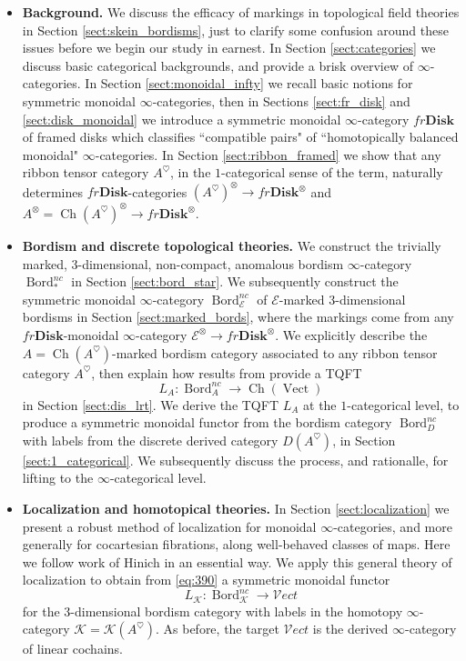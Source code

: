 \documentclass[reqno]{amsart}
\theoremstyle{definition}
\newcommand{\msc}[1]{\mathscr{#1}}
\newcommand{\opn}[1]{\operatorname{#1}}
\newcommand{\ot}{\otimes}
\newcommand{\Vect}{\msc{V}\!ect}
\newcommand{\Disk}{\mathbf{Disk}}
\DeclareMathOperator{\Bord}{Bord}
\renewcommand{\1}{\mathbf{1}}
\begin{document}
\begin{itemize}
\item {\bf Background.} We discuss the efficacy of markings in topological field theories in Section \ref{sect:skein_bordisms}, just to clarify some confusion around these issues before we begin our study in earnest. In Section \ref{sect:categories} we discuss basic categorical backgrounds, and provide a brisk overview of $\infty$-categories.  In Section \ref{sect:monoidal_infty} we recall basic notions for symmetric monoidal $\infty$-categories, then in Sections \ref{sect:fr_disk} and \ref{sect:disk_monoidal} we introduce a symmetric monoidal $\infty$-category $fr\Disk$ of framed disks which classifies ``compatible pairs" of ``homotopically balanced monoidal" $\infty$-categories. In Section \ref{sect:ribbon_framed} we show that any ribbon tensor category $A^{\heartsuit}$, in the $1$-categorical sense of the term, naturally determines $fr\Disk$-categories $(A^{\heartsuit})^{\ot}\to fr\Disk^{\ot}$ and $A^{\ot}=\opn{Ch}(A^{\heartsuit})^{\ot}\to fr\Disk^{\ot}$.
\vspace{2mm}

\item {\bf Bordism and discrete topological theories.} We construct the trivially marked, $3$-dimensional, non-compact, anomalous bordism $\infty$-category $\Bord_{\ast}^{nc}$ in Section \ref{sect:bord_star}. We subsequently construct the symmetric monoidal $\infty$-category $\Bord^{nc}_{\msc{E}}$ of $\msc{E}$-marked $3$-dimensional bordisms in Section \ref{sect:marked_bords}, where the markings come from any $fr\Disk$-monoidal $\infty$-category $\msc{E}^{\ot}\to fr\Disk^{\ot}$.  We explicitly describe the $A=\opn{Ch}(A^{\heartsuit})$-marked bordism category associated to any ribbon tensor category $A^{\heartsuit}$, then explain how results from \cite{derenzietal23,czenkynegron} provide a TQFT
\begin{equation}\label{eq:390}
L_{A}:\Bord_{A}^{nc}\to \opn{Ch}(\opn{Vect})
\end{equation}
in Section \ref{sect:dis_lrt}. We derive the TQFT $L_A$ at the $1$-categorical level, to produce a symmetric monoidal functor from the bordism category $\Bord_D^{nc}$ with labels from the discrete derived category $D(A^{\heartsuit})$, in Section \ref{sect:1_categorical}. We subsequently discuss the process, and rationalle, for lifting to the $\infty$-categorical level.
\vspace{2mm}

\item {\bf Localization and homotopical theories.} In Section \ref{sect:localization} we present a robust method of localization for monoidal $\infty$-categories, and more generally for cocartesian fibrations, along well-behaved classes of maps. Here we follow work of Hinich \cite{hinich16} in an essential way. We apply this general theory of localization to obtain from \eqref{eq:390} a symmetric monoidal functor
\[
L_{\msc{K}}:\Bord_{\msc{K}}^{nc}\to \Vect
\]
for the $3$-dimensional bordism category with labels in the homotopy $\infty$-category $\msc{K}=\msc{K}(A^{\heartsuit})$. As before, the target $\Vect$ is the derived $\infty$-category of linear cochains.\vspace{2mm}


\end{itemize}
\end{document}
